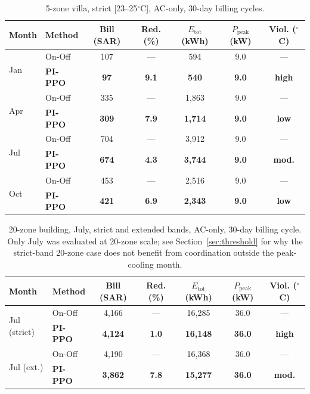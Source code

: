 \documentclass[12pt,a4paper]{article}
\begin{document}
\begin{table}[H]
\centering
\caption{5-zone villa, strict [23--25$^\circ$C], AC-only, 30-day billing cycles.}
\label{tab:seasonal5z}
\begin{tabular*}{\textwidth}{@{\extracolsep{\fill}}llccccc@{}}
\toprule
\textbf{Month} & \textbf{Method} & \textbf{Bill} (SAR) & \textbf{Red.} (\%) & $E_{\text{tot}}$ (kWh) & $P_{\text{peak}}$ (kW) & \textbf{Viol.} ($^\circ$C) \\
\midrule
\multirow{2}{*}{Jan} & On-Off & 107 & --- & 594 & 9.0 & --- \\
 & \textbf{PI-PPO} & \textbf{97} & \textbf{9.1} & \textbf{540} & \textbf{9.0} & \textbf{high} \\
\midrule
\multirow{2}{*}{Apr} & On-Off & 335 & --- & 1{,}863 & 9.0 & --- \\
 & \textbf{PI-PPO} & \textbf{309} & \textbf{7.9} & \textbf{1{,}714} & \textbf{9.0} & \textbf{low} \\
\midrule
\multirow{2}{*}{Jul} & On-Off & 704 & --- & 3{,}912 & 9.0 & --- \\
 & \textbf{PI-PPO} & \textbf{674} & \textbf{4.3} & \textbf{3{,}744} & \textbf{9.0} & \textbf{mod.} \\
\midrule
\multirow{2}{*}{Oct} & On-Off & 453 & --- & 2{,}516 & 9.0 & --- \\
 & \textbf{PI-PPO} & \textbf{421} & \textbf{6.9} & \textbf{2{,}343} & \textbf{9.0} & \textbf{low} \\
\bottomrule
\end{tabular*}
\end{table}

\begin{table}[H]
\centering
\caption{20-zone building, July, strict and extended bands, AC-only, 30-day billing cycle. Only July was evaluated at 20-zone scale; see Section~\ref{sec:threshold} for why the strict-band 20-zone case does not benefit from coordination outside the peak-cooling month.}
\label{tab:seasonal20z}
\begin{tabular*}{\textwidth}{@{\extracolsep{\fill}}llccccc@{}}
\toprule
\textbf{Month} & \textbf{Method} & \textbf{Bill} (SAR) & \textbf{Red.} (\%) & $E_{\text{tot}}$ (kWh) & $P_{\text{peak}}$ (kW) & \textbf{Viol.} ($^\circ$C) \\
\midrule
\multirow{2}{*}{Jul (strict)} & On-Off & 4{,}166 & --- & 16{,}285 & 36.0 & --- \\
 & \textbf{PI-PPO} & \textbf{4{,}124} & \textbf{1.0} & \textbf{16{,}148} & \textbf{36.0} & \textbf{high} \\
\midrule
\multirow{2}{*}{Jul (ext.)} & On-Off & 4{,}190 & --- & 16{,}368 & 36.0 & --- \\
 & \textbf{PI-PPO} & \textbf{3{,}862} & \textbf{7.8} & \textbf{15{,}277} & \textbf{36.0} & \textbf{mod.} \\
\bottomrule
\end{tabular*}
\end{table}
\end{document}
